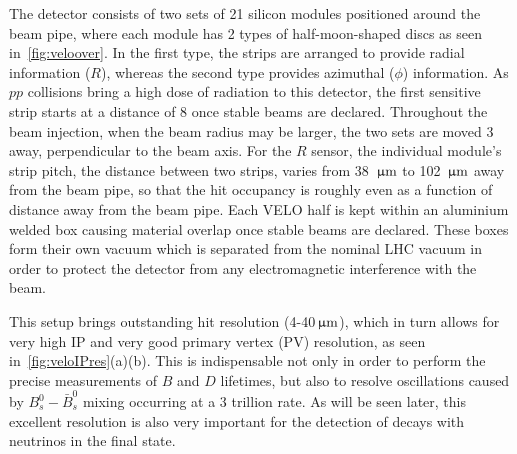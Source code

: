 The detector consists of two sets of 21 silicon modules positioned around the beam pipe, where each module has 2 types of half-moon-shaped discs as seen in~\autoref{fig:veloover}. In the first type, the strips are arranged to provide radial information ($R$), whereas the second type provides azimuthal ($\phi$) information. As $pp$ collisions bring a high dose of radiation to this detector, the first sensitive strip starts at a distance of 8 \mm once stable beams are declared. Throughout the beam injection, when the beam radius may be larger, the two sets are moved 3 \cm away, perpendicular to the beam axis. For the $R$ sensor, the individual module's strip pitch, the distance between two strips, varies from 38 ${\,\upmu\rm m}$ to 102 ${\,\upmu\rm m}$ away from the beam pipe, so that the hit occupancy is roughly even as a function of distance away from the beam pipe. Each \Gls{VELO} half is kept within an aluminium welded box causing material overlap once stable beams are declared. These boxes form their own vacuum which is separated from the nominal \gls{LHC} vacuum in order to protect the detector from any electromagnetic interference with the beam. 

This setup brings outstanding hit resolution (4-40${\,\upmu\rm m}$), which in turn allows for very high \gls{IP} and very good primary vertex (\gls{PV}) resolution, as seen in~\autoref{fig:veloIPres}(a)(b). This is indispensable not only in order to perform the precise measurements of $B$ and $D$ lifetimes, but also to resolve oscillations caused by $B^{0}_{s}-\bar{B}^{0}_{s}$ mixing occurring at a 3 trillion \hz rate. As will be seen later, this excellent resolution is also very important for the detection of decays with neutrinos in the final state.

